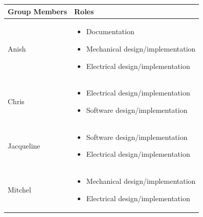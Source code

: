 \documentclass[a4]{article}
\begin{document}
\begin{table}[h!]
	\centering
	\begin{tabularx}{\linewidth}{|Y|Y|}
		\hline
		\textcolor{McMasterMaroon}{\textbf{Group Members}} &
		\textcolor{McMasterMaroon}{\textbf{Roles}}                       \\
		\hline
		Anish                                              &
		\begin{minipage}[c]{\linewidth} %
			\vspace{2mm}
			\begin{itemize}[leftmargin=*, labelsep=3pt]
				\item Documentation
				\item Mechanical design/implementation
				\item Electrical design/implementation
			\end{itemize}
			\vspace{2mm}
		\end{minipage}  \\
		\hline

		Chris                                              &
		\begin{minipage}[c]{\linewidth} %
			\vspace{2mm}
			\begin{itemize}[leftmargin=*, labelsep=3pt]
				\item Electrical design/implementation
				\item Software design/implementation
			\end{itemize}
			\vspace{2mm}
		\end{minipage}  \\
		\hline

		Jacqueline                                         &
		\begin{minipage}[c]{\linewidth} %
			\vspace{2mm}
			\begin{itemize}[leftmargin=*, labelsep=3pt]
				\item Software design/implementation
				\item Electrical design/implementation
			\end{itemize}
			\vspace{2mm}
		\end{minipage}  \\
		\hline

		Mitchel                                            &
		\begin{minipage}[c]{\linewidth} %
			\vspace{2mm}
			\begin{itemize}[leftmargin=*, labelsep=3pt]
				\item Mechanical design/implementation
				\item Electrical design/implementation
			\end{itemize}
			\vspace{2mm}
		\end{minipage} \\
		\hline


\end{tabularx}
\end{table}
\end{document}
